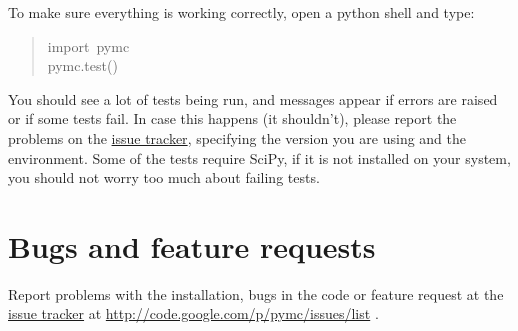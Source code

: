 To make sure everything is working correctly, open a python shell and type:
\begin{quote}{\ttfamily \raggedright \noindent
import~pymc~\\
pymc.test()
}\end{quote}

You should see a lot of tests being run, and messages appear if errors are
raised or if some tests fail. In case this happens (it shouldn't), please report
the problems on the \href{http://code.google.com/p/pymc/issues/list.}{issue tracker}, specifying the version you are using and the
environment. Some of the tests require SciPy, if it is not installed on your
system, you should not worry too much about failing tests.



\hypertarget{bugs-and-feature-requests}{}
\section*{Bugs and feature requests}
\label{bugs-and-feature-requests}

Report problems with the installation, bugs in the code or feature request at
the \href{http://code.google.com/p/pymc/issues/list.}{issue tracker} at \href{http://code.google.com/p/pymc/issues/list}{http://code.google.com/p/pymc/issues/list} .

